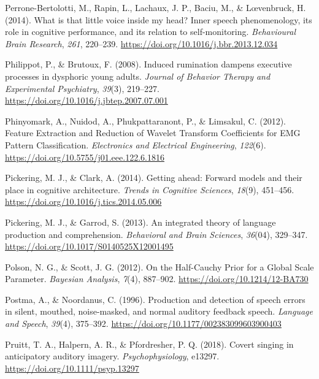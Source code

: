 \documentclass[a4paper,12pt,twoside,openright,oldfontcommands]{memoir}
\begin{document}
\leavevmode\hypertarget{ref-Perrone-Bertolotti2014}{}%
Perrone-Bertolotti, M., Rapin, L., Lachaux, J. P., Baciu, M., \& Lœvenbruck, H. (2014). What is that little voice inside my head? Inner speech phenomenology, its role in cognitive performance, and its relation to self-monitoring. \emph{Behavioural Brain Research}, \emph{261}, 220--239. \url{https://doi.org/10.1016/j.bbr.2013.12.034}

\leavevmode\hypertarget{ref-Philippot2008}{}%
Philippot, P., \& Brutoux, F. (2008). Induced rumination dampens executive processes in dysphoric young adults. \emph{Journal of Behavior Therapy and Experimental Psychiatry}, \emph{39}(3), 219--227. \url{https://doi.org/10.1016/j.jbtep.2007.07.001}

\leavevmode\hypertarget{ref-phinyomark_feature_2012}{}%
Phinyomark, A., Nuidod, A., Phukpattaranont, P., \& Limsakul, C. (2012). Feature Extraction and Reduction of Wavelet Transform Coefficients for EMG Pattern Classification. \emph{Electronics and Electrical Engineering}, \emph{122}(6). \url{https://doi.org/10.5755/j01.eee.122.6.1816}

\leavevmode\hypertarget{ref-pickering_getting_2014}{}%
Pickering, M. J., \& Clark, A. (2014). Getting ahead: Forward models and their place in cognitive architecture. \emph{Trends in Cognitive Sciences}, \emph{18}(9), 451--456. \url{https://doi.org/10.1016/j.tics.2014.05.006}

\leavevmode\hypertarget{ref-pickering_integrated_2013}{}%
Pickering, M. J., \& Garrod, S. (2013). An integrated theory of language production and comprehension. \emph{Behavioral and Brain Sciences}, \emph{36}(04), 329--347. \url{https://doi.org/10.1017/S0140525X12001495}

\leavevmode\hypertarget{ref-polson_half-cauchy_2012}{}%
Polson, N. G., \& Scott, J. G. (2012). On the Half-Cauchy Prior for a Global Scale Parameter. \emph{Bayesian Analysis}, \emph{7}(4), 887--902. \url{https://doi.org/10.1214/12-BA730}

\leavevmode\hypertarget{ref-postma_production_1996}{}%
Postma, A., \& Noordanus, C. (1996). Production and detection of speech errors in silent, mouthed, noise-masked, and normal auditory feedback speech. \emph{Language and Speech}, \emph{39}(4), 375--392. \url{https://doi.org/10.1177/002383099603900403}

\leavevmode\hypertarget{ref-pruitt_covert_2018}{}%
Pruitt, T. A., Halpern, A. R., \& Pfordresher, P. Q. (2018). Covert singing in anticipatory auditory imagery. \emph{Psychophysiology}, e13297. \url{https://doi.org/10.1111/psyp.13297}
\end{document}

